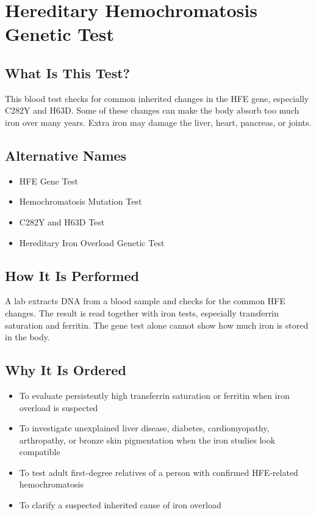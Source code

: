 \chapter{Hereditary Hemochromatosis Genetic Test}

\section*{What Is This Test?}
This blood test checks for common inherited changes in the HFE gene, especially C282Y and H63D. Some of these changes can make the body absorb too much iron over many years. Extra iron may damage the liver, heart, pancreas, or joints.

\section*{Alternative Names}
\begin{itemize}
  \item HFE Gene Test
  \item Hemochromatosis Mutation Test
  \item C282Y and H63D Test
  \item Hereditary Iron Overload Genetic Test
\end{itemize}
\section*{How It Is Performed}
A lab extracts DNA from a blood sample and checks for the common HFE changes. The result is read together with iron tests, especially transferrin saturation and ferritin. The gene test alone cannot show how much iron is stored in the body.

\section*{Why It Is Ordered}
\begin{itemize}
  \item To evaluate persistently high transferrin saturation or ferritin when iron overload is suspected
  \item To investigate unexplained liver disease, diabetes, cardiomyopathy, arthropathy, or bronze skin pigmentation when the iron studies look compatible
  \item To test adult first-degree relatives of a person with confirmed HFE-related hemochromatosis
  \item To clarify a suspected inherited cause of iron overload
\end{itemize}

